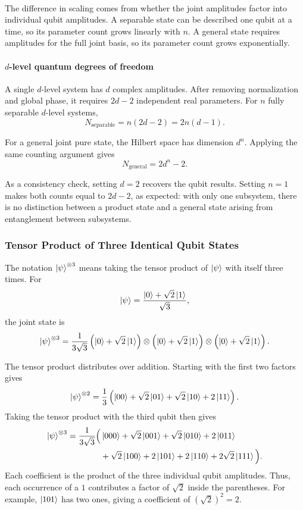\documentclass[11pt]{article}
\begin{document}
\paragraph{}The difference in scaling comes from whether the joint
amplitudes factor into individual qubit amplitudes.
A separable state can be described one qubit at a time,
so its parameter count grows linearly with $n$.
A general state requires amplitudes for the full joint basis,
so its parameter count grows exponentially.

\paragraph{$d$-level quantum degrees of freedom}
A single $d$-level system has $d$ complex amplitudes.
After removing normalization and global phase, it requires
$2d-2$ independent real parameters. For $n$ fully separable
$d$-level systems,
\[
\boxed{N_{\mathrm{separable}}=n(2d-2)=2n(d-1).}
\]

For a general joint pure state, the Hilbert space has
dimension $d^n$. Applying the same counting argument gives
\[
\boxed{N_{\mathrm{general}}=2d^n-2.}
\]

As a consistency check, setting $d=2$ recovers the qubit
results. Setting $n=1$ makes both counts equal to $2d-2$,
as expected: with only one subsystem, there is no distinction
between a product state and a general state arising from
entanglement between subsystems.


\subsubsection{Tensor Product of Three Identical Qubit States}
\label{ex:three-qubit-product}

The notation $\ket{\psi}^{\otimes 3}$ means taking the tensor
product of $\ket{\psi}$ with itself three times. For
\[
\ket{\psi}
=
\frac{\ket{0}+\sqrt{2}\ket{1}}{\sqrt{3}},
\]
the joint state is
\[
\ket{\psi}^{\otimes 3}
=
\frac{1}{3\sqrt{3}}
\left(\ket{0}+\sqrt{2}\ket{1}\right)
\otimes
\left(\ket{0}+\sqrt{2}\ket{1}\right)
\otimes
\left(\ket{0}+\sqrt{2}\ket{1}\right).
\]

The tensor product distributes over addition. Starting with
the first two factors gives
\[
\ket{\psi}^{\otimes 2}
=
\frac{1}{3}
\left(
\ket{00}
+\sqrt{2}\ket{01}
+\sqrt{2}\ket{10}
+2\ket{11}
\right).
\]
Taking the tensor product with the third qubit then gives
\[
\begin{aligned}
\ket{\psi}^{\otimes 3}
=
\frac{1}{3\sqrt{3}}\Big(
&\ket{000}
+\sqrt{2}\ket{001}
+\sqrt{2}\ket{010}
+2\ket{011}\\
&+\sqrt{2}\ket{100}
+2\ket{101}
+2\ket{110}
+2\sqrt{2}\ket{111}
\Big).
\end{aligned}
\]
Each coefficient is the product of the three individual
qubit amplitudes. Thus, each occurrence of a $1$ contributes
a factor of $\sqrt{2}$ inside the parentheses. For example,
$\ket{101}$ has two ones, giving a coefficient of
$(\sqrt{2})^2=2$.
\end{document}
